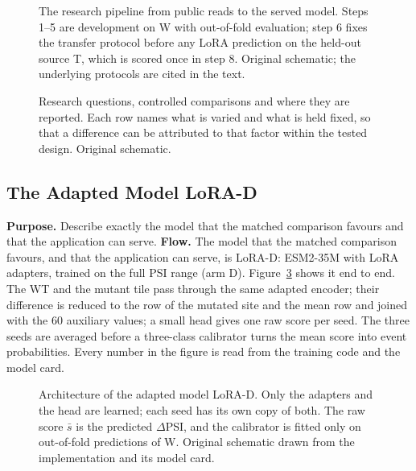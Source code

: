 \begin{figure}[htbp]
  \centering
  
  \caption[The research pipeline from public reads to the served model]{The research pipeline from public reads to the served model. Steps 1--5 are development
  on W with out-of-fold evaluation; step 6 fixes the transfer protocol before any LoRA prediction on
  the held-out source T, which is scored once in step 8. Original schematic; the underlying protocols
  are cited in the text.}
  \label{fig:research-pipeline}
\end{figure}

\begin{figure}[htbp]
  \centering
  
  \caption[Research questions, controlled comparisons and where they are reported]{Research questions, controlled comparisons and where they are reported. Each row names
  what is varied and what is held fixed, so that a difference can be attributed to that factor within
  the tested design. Original schematic.}
  \label{fig:experiment-design}
\end{figure}



\subsection{The Adapted Model LoRA-D}\label{sec:lora-d-model}
\textbf{Purpose.} Describe exactly the model that the matched comparison favours and that the application can serve.
\textbf{Flow.} The model that the matched comparison favours, and that the application can serve, is LoRA-D:
ESM2-35M with LoRA adapters, trained on the full PSI range (arm D). Figure~\ref{fig:lora-d-architecture}
shows it end to end. The WT and the mutant tile pass through the same adapted encoder; their
difference is reduced to the row of the mutated site and the mean row and joined with the 60
auxiliary values; a small head gives one raw score per seed. The three seeds are averaged before a
three-class calibrator turns the mean score into event probabilities. Every number in the figure is
read from the training code and the model card.

\begin{figure}[htbp]
  \centering
  
  \caption[Architecture of the adapted model LoRA-D]{Architecture of the adapted model LoRA-D. Only the adapters and the head are learned;
  each seed has its own copy of both. The raw score $\bar s$ is the predicted $\Delta$PSI, and the
  calibrator is fitted only on out-of-fold predictions of W. Original schematic drawn from the
  implementation and its model card.}
  \label{fig:lora-d-architecture}
\end{figure}

